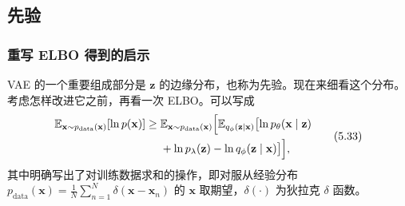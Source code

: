 \subsection{先验}
\label{sec:vae-priors}
\subsubsection{重写 ELBO 得到的启示}
VAE 的一个重要组成部分是 $\mathbf{z}$ 的边缘分布，也称为先验。现在来细看这个分布。考虑怎样改进它之前，再看一次 ELBO。可以写成
\begin{equation}
\begin{aligned}
\mathbb{E}_{\mathbf{x}\sim p_{\mathrm{data}}(\mathbf{x})}[\ln p(\mathbf{x})]
 \geq{}&\mathbb{E}_{\mathbf{x}\sim p_{\mathrm{data}}(\mathbf{x})}\Bigl[
  \mathbb{E}_{q_\phi(\mathbf{z}\mid\mathbf{x})}\bigl[\ln p_\theta(\mathbf{x}\mid\mathbf{z})\\
 &+\ln p_\lambda(\mathbf{z})-\ln q_\phi(\mathbf{z}\mid\mathbf{x})\bigr]\Bigr],
\end{aligned}
\tag{5.33}\label{eq:05-33}
\end{equation}
其中明确写出了对训练数据求和的操作，即对服从经验分布 $p_{\mathrm{data}}(\mathbf{x})=\frac{1}{N}\sum_{n=1}^N\delta(\mathbf{x}-\mathbf{x}_n)$ 的 $\mathbf{x}$ 取期望，$\delta(\cdot)$ 为狄拉克 $\delta$ 函数。

